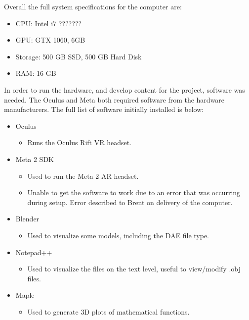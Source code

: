     Overall the full system specifications for the computer are:

    \begin{itemize}
        \item CPU: Intel i7 ???????
        \item GPU: GTX 1060, 6GB
        \item Storage: 500 GB SSD, 500 GB Hard Disk
        \item RAM: 16 GB
    \end{itemize}

    In order to run the hardware, and develop content for the project, software was needed.  The Oculus and Meta both required software from the hardware manufacturers.  The full list of software initially installed is below:

    \begin{itemize}
        \item Oculus
        \begin{itemize}
            \item Runs the Oculus Rift VR headset.
        \end{itemize}
        \item Meta 2 SDK
        \begin{itemize}
            \item Used to run the Meta 2 AR headset.
            \item Unable to get the software to work due to an error that was occurring during setup.  Error described to Brent on delivery of the computer.
        \end{itemize}
        \item Blender
        \begin{itemize}
            \item Used to visualize some models, including the DAE file type.
        \end{itemize}
        \item Notepad++
        \begin{itemize}
            \item Used to visualize the files on the text level, useful to view/modify .obj files.
        \end{itemize}
        \item Maple
        \begin{itemize}
            \item Used to generate 3D plots of mathematical functions.
        \end{itemize}
    \end{itemize}

